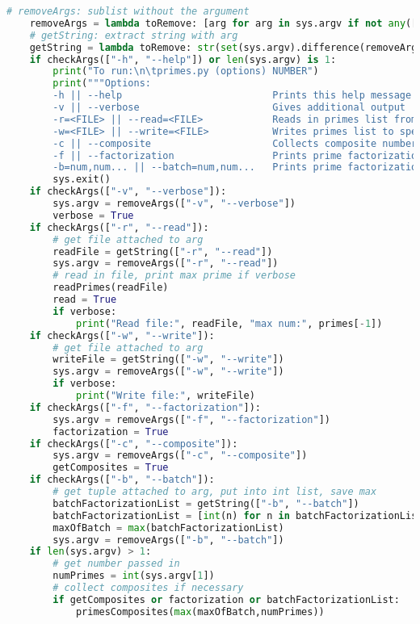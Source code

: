 \documentclass[12pt]{article}
\begin{document}
\begin{lstlisting}[language=Python]
    # removeArgs: sublist without the argument
    removeArgs = lambda toRemove: [arg for arg in sys.argv if not any([arg.startswith(s) for s in toRemove])]
    # getString: extract string with arg
    getString = lambda toRemove: str(set(sys.argv).difference(removeArgs(toRemove)).pop()).split('=', 1)[1]
    if checkArgs(["-h", "--help"]) or len(sys.argv) is 1:
        print("To run:\n\tprimes.py (options) NUMBER")
        print("""Options:
        -h || --help                          Prints this help message
        -v || --verbose                       Gives additional output
        -r=<FILE> || --read=<FILE>            Reads in primes list from specified file (JSON)
        -w=<FILE> || --write=<FILE>           Writes primes list to specified file (JSON)
        -c || --composite                     Collects composite numbers also
        -f || --factorization                 Prints prime factorization of NUMBER
        -b=num,num... || --batch=num,num...   Prints prime factorization of num,num,num...""")
        sys.exit()
    if checkArgs(["-v", "--verbose"]):
        sys.argv = removeArgs(["-v", "--verbose"])
        verbose = True
    if checkArgs(["-r", "--read"]):
        # get file attached to arg
        readFile = getString(["-r", "--read"])
        sys.argv = removeArgs(["-r", "--read"])
        # read in file, print max prime if verbose
        readPrimes(readFile)
        read = True
        if verbose:
            print("Read file:", readFile, "max num:", primes[-1])
    if checkArgs(["-w", "--write"]):
        # get file attached to arg
        writeFile = getString(["-w", "--write"])
        sys.argv = removeArgs(["-w", "--write"])
        if verbose:
            print("Write file:", writeFile)
    if checkArgs(["-f", "--factorization"]):
        sys.argv = removeArgs(["-f", "--factorization"])
        factorization = True
    if checkArgs(["-c", "--composite"]):
        sys.argv = removeArgs(["-c", "--composite"])
        getComposites = True
    if checkArgs(["-b", "--batch"]):
        # get tuple attached to arg, put into int list, save max
        batchFactorizationList = getString(["-b", "--batch"])
        batchFactorizationList = [int(n) for n in batchFactorizationList.split(",")]
        maxOfBatch = max(batchFactorizationList)
        sys.argv = removeArgs(["-b", "--batch"])
    if len(sys.argv) > 1:
        # get number passed in
        numPrimes = int(sys.argv[1])
        # collect composites if necessary
        if getComposites or factorization or batchFactorizationList:
            primesComposites(max(maxOfBatch,numPrimes))

\end{lstlisting}
\end{document}
